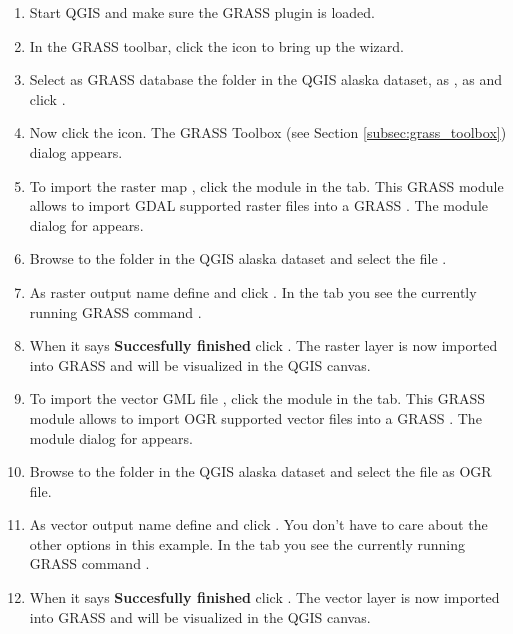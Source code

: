 \begin{enumerate}
  \item Start QGIS and make sure the GRASS plugin is loaded.
  \item In the GRASS toolbar, click the  icon to bring up the  wizard.
  \item Select as GRASS database the folder  in the QGIS 
  alaska dataset, as , as  
   and click .
  \item Now click the  icon. The 
  GRASS Toolbox (see Section \ref{subsec:grass_toolbox}) dialog appears.
  \item To import the raster map , click the module 
   in the  tab. This GRASS module 
  allows to import GDAL supported raster files into a GRASS 
  . The module dialog for  appears.
  \item Browse to the folder  in the QGIS alaska dataset 
  and select the file .
  \item As raster output name define  and click 
  . In the  tab you see the currently running GRASS 
  command .
  \item When it says \textbf{Succesfully finished} click . 
  The  raster layer is now imported into GRASS and 
  will be visualized in the QGIS canvas.
  \item To import the vector GML file , click the module 
   in the  tab. This GRASS module allows 
  to import OGR supported vector files into a GRASS . The 
  module dialog for  appears.
  \item Browse to the folder  in the QGIS alaska 
  dataset and select the file  as OGR file.
  \item As vector output name define  and click 
  . You don't have to care about the other options in this 
  example. In the  tab you see the currently running GRASS 
  command .
  \item When it says \textbf{Succesfully finished} click . 
  The  vector layer is now imported into GRASS and will 
  be visualized in the QGIS canvas. 
\end{enumerate}


